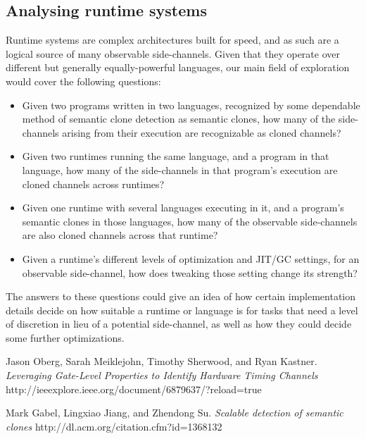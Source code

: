 \documentclass{article}
\begin{document}
\subsection{Analysing runtime systems}

Runtime systems are complex architectures built for speed, and as such are a
logical source of many observable side-channels. Given that they operate over
different but generally equally-powerful languages, our main field of
exploration would cover the following questions: 
\begin{itemize}     
	\item{Given two programs written in two languages, recognized by some 
	dependable method of semantic clone detection\cite{sem-clo-det} as semantic 
	clones, how many of the side-channels arising from their execution are 
	recognizable as cloned channels?}
	\item{Given two runtimes running the same language, and a program in that 
	language, how many of the side-channels in that program's execution are
	cloned channels across runtimes?} 
	\item{Given one runtime with several languages executing in it, and a program's 
	semantic clones in those languages, how many of the observable side-channels 
	are also cloned channels across that runtime?}
	\item{Given a runtime's different levels of optimization and JIT/GC settings,
	for an observable side-channel, how does tweaking those setting change its
	strength?}
\end{itemize}
The answers to these questions could give an idea of how certain implementation
details decide on how suitable a runtime or language is for tasks that need a level
of discretion in lieu of a potential side-channel, as well as how they could 
decide some further optimizations.

\pagebreak
\begin{thebibliography}{9}
Jason Oberg, Sarah Meiklejohn, Timothy Sherwood, and Ryan Kastner.
\textit{Leveraging Gate-Level Properties to Identify Hardware Timing Channels}
http://ieeexplore.ieee.org/document/6879637/?reload=true

Mark Gabel, Lingxiao Jiang, and Zhendong Su.
\textit{Scalable detection of semantic clones}
http://dl.acm.org/citation.cfm?id=1368132
\end{thebibliography}
\end{document}
